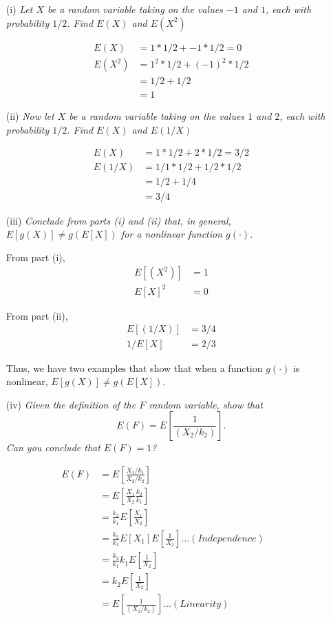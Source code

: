 \documentclass[
]{article}
\begin{document}
\begin{enumerate} 
\item[(i)]  \textit{Let $X$ be a random variable taking on the values $-1$ and $1$, each with probability $1/2$. Find $E(X)$ and $E(X^2)$}  
  
\[\begin{aligned} 
E(X) &= 1 * 1/2 + -1 * 1/2 = 0 \\
E(X^2) &= 1^2 * 1/2 + (-1)^2 * 1/2 \\
&= 1/2 + 1/2 \\
&= 1
\end{aligned}\]

\item[(ii)]  \textit{Now let $X$ be a random variable taking on the values $1$ and $2$, each with probability $1/2$. Find $E(X)$ and $E(1/X)$}  
  
\[\begin{aligned} 
E(X) &= 1 * 1/2 + 2 * 1/2 = 3/2 \\
E(1/X) &= 1/1 * 1/2 + 1/2 * 1/2 \\
&= 1/2 + 1/4 \\
&= 3/4
\end{aligned}\]

\item[(iii)] \textit{Conclude from parts (i) and (ii) that, in general, $E[g(X)] \neq g(E[X])$ for a nonlinear function $g(\cdot)$.}  
  
From part (i),
\[\begin{aligned}
E[(X^2)] &= 1 \\
E[X]^2 &= 0
\end{aligned}\]  

From part (ii),
\[\begin{aligned}
E[(1/X)] &= 3/4 \\
1/E[X] &= 2/3
\end{aligned}\]

Thus, we have two examples that show that when a function $g(\cdot)$ is nonlinear, $E[g(X)] \neq g(E[X])$.  
  
\item[(iv)] \textit{Given the definition of the $F$ random variable, show that $$E(F) = E[\frac{1}{(X_2/k_2)}].$$ Can you conclude that $E(F) = 1$?}  

\end{enumerate}

\[\begin{aligned} 
E(F) &= E[\frac{X_1/k_1}{X_2/k_2}] \\
&= E[\frac{X_1}{X_2}\frac{k_2}{k_1}] \\
&= \frac{k_2}{k_1}E[\frac{X_1}{X_2}] \\
&= \frac{k_2}{k_1}E[X_1]E[\frac{1}{X_2}]\dots (Independence) \\
&=  \frac{k_2}{k_1}k_1E[\frac{1}{X_2}] \\
&= k_2 E[\frac{1}{X_2}] \\
&= E[\frac{1}{(X_2/k_2)}] \dots (Linearity)
\end{aligned}\]
\end{document}
